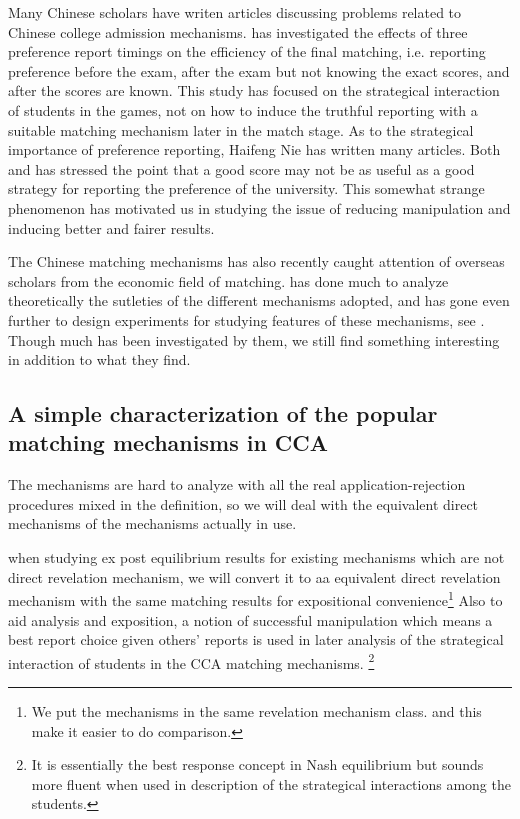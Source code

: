 Many Chinese scholars have writen articles discussing problems related
to Chinese college admission mechanisms. \parencite{Zhong2004} has investigated the effects
of three preference report timings on the efficiency of the final matching, i.e. reporting preference
before the exam, after the exam but not knowing the exact scores,  and
after the scores are known.  This study has focused on the
strategical interaction of students in the games, not on how to induce
the truthful reporting with a suitable matching mechanism later in the match stage.  As to the strategical importance of
preference reporting,  Haifeng Nie has written many articles.  Both \parencite{Nie2007a}
and \parencite{Nie2007b} has stressed the point that a good score may
not be as useful as a good strategy for reporting the preference of
the university. This somewhat strange phenomenon has motivated us
in studying the issue of reducing manipulation and inducing better
and fairer results.

The Chinese  matching mechanisms has also recently caught attention of overseas scholars from
the economic field of matching. \parencite{YanChenJPE} has
done much to analyze theoretically the sutleties of the different
mechanisms adopted, and has gone even further to design experiments
for studying features of these mechanisms,
see \parencite{YanChen2016}. Though much has been investigated by them, we still find something interesting in addition to what they find.



\subsection{A simple characterization of the popular matching mechanisms in CCA}

The mechanisms are hard to analyze with all the real application-rejection procedures mixed in the definition,
so we will deal with the equivalent direct mechanisms of the mechanisms actually in use.

when studying ex post equilibrium results for existing
mechanisms which are not direct revelation mechanism, we will convert it to aa
equivalent direct revelation mechanism with the same matching results for expositional convenience\footnote{We put the
  mechanisms in the same revelation mechanism class. and this make it easier to do
  comparison.}  Also to aid analysis and exposition, a notion of successful
manipulation which means a best report choice given others' reports is
used in later analysis of the strategical interaction of
students in the CCA matching mechanisms. \footnote{ It is
  essentially the best response concept in Nash equilibrium but sounds
  more fluent when used in description of the strategical interactions
  among the students.}

